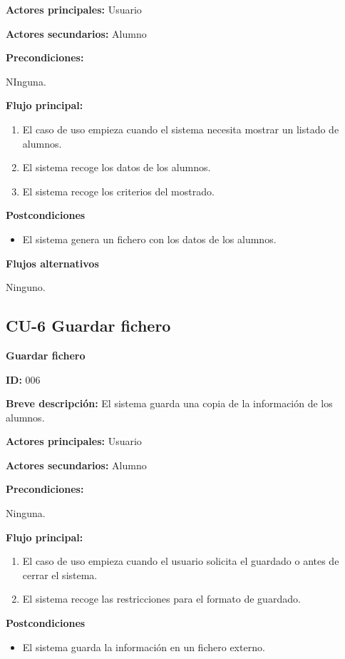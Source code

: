 \textbf{Actores principales:} Usuario

\textbf{Actores secundarios:} Alumno

\textbf{Precondiciones:}

NInguna.

\textbf{Flujo principal:}

\begin{enumerate}
	\item El caso de uso empieza cuando el sistema necesita mostrar un listado de alumnos.
	\item El sistema recoge los datos de los alumnos.
	\item El sistema recoge los criterios del mostrado.
\end{enumerate}

\textbf{Postcondiciones}

\begin{itemize}
	\item El sistema genera un fichero con los datos de los alumnos.
\end{itemize}

\textbf{Flujos alternativos}

Ninguno.

\subsection{CU-6 Guardar fichero}
\textbf{Guardar fichero}

\textbf{ID:} 006

\textbf{Breve descripción:} El sistema guarda una copia de la información de los alumnos.

\textbf{Actores principales:} Usuario

\textbf{Actores secundarios:} Alumno

\textbf{Precondiciones:}

Ninguna.

\textbf{Flujo principal:}

\begin{enumerate}
	\item El caso de uso empieza cuando el usuario solicita el guardado o antes de cerrar el sistema.
	\item El sistema recoge las restricciones para el formato de guardado.
\end{enumerate}

\textbf{Postcondiciones}

\begin{itemize}
	\item El sistema guarda la información en un fichero externo.
\end{itemize}


